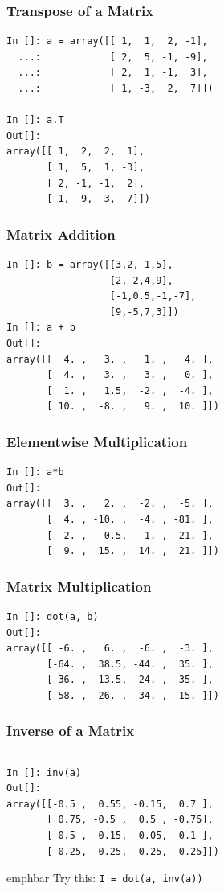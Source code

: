 \documentclass[14pt,compress]{beamer}
\newcommand{\emphbar}[1]
{\begin{beamercolorbox}[rounded=true]{emphbar} 
      {#1}
 \end{beamercolorbox}
}
\newcommand{\typ}[1]{\lstinline{#1}}
\begin{document}
\begin{frame}[fragile]
\frametitle{Transpose of a Matrix}
\begin{lstlisting}
In []: a = array([[ 1,  1,  2, -1],
  ...:            [ 2,  5, -1, -9],
  ...:            [ 2,  1, -1,  3],
  ...:            [ 1, -3,  2,  7]])

In []: a.T
Out[]:
array([[ 1,  2,  2,  1],
       [ 1,  5,  1, -3],
       [ 2, -1, -1,  2],
       [-1, -9,  3,  7]])
\end{lstlisting}
\end{frame}

\begin{frame}[fragile]
  \frametitle{Matrix Addition}
  \begin{lstlisting}
In []: b = array([[3,2,-1,5],
                  [2,-2,4,9],
                  [-1,0.5,-1,-7],
                  [9,-5,7,3]])
In []: a + b
Out[]: 
array([[  4. ,   3. ,   1. ,   4. ],
       [  4. ,   3. ,   3. ,   0. ],
       [  1. ,   1.5,  -2. ,  -4. ],
       [ 10. ,  -8. ,   9. ,  10. ]])
  \end{lstlisting}
\end{frame}

\begin{frame}[fragile]
\frametitle{Elementwise Multiplication}
\begin{lstlisting}
In []: a*b
Out[]: 
array([[  3. ,   2. ,  -2. ,  -5. ],
       [  4. , -10. ,  -4. , -81. ],
       [ -2. ,   0.5,   1. , -21. ],
       [  9. ,  15. ,  14. ,  21. ]])

\end{lstlisting}
\end{frame}

\begin{frame}[fragile]
\frametitle{Matrix Multiplication}
\begin{lstlisting}
In []: dot(a, b)
Out[]: 
array([[ -6. ,   6. ,  -6. ,  -3. ],
       [-64. ,  38.5, -44. ,  35. ],
       [ 36. , -13.5,  24. ,  35. ],
       [ 58. , -26. ,  34. , -15. ]])
\end{lstlisting}
\end{frame}

\begin{frame}[fragile]
\frametitle{Inverse of a Matrix}
\begin{lstlisting}

\end{lstlisting}
\begin{small}
\begin{lstlisting}
In []: inv(a)
Out[]: 
array([[-0.5 ,  0.55, -0.15,  0.7 ],
       [ 0.75, -0.5 ,  0.5 , -0.75],
       [ 0.5 , -0.15, -0.05, -0.1 ],
       [ 0.25, -0.25,  0.25, -0.25]])
\end{lstlisting}
\end{small}
\emphbar{Try this: \typ{I = dot(a, inv(a))}}
\end{frame}
\end{document}
